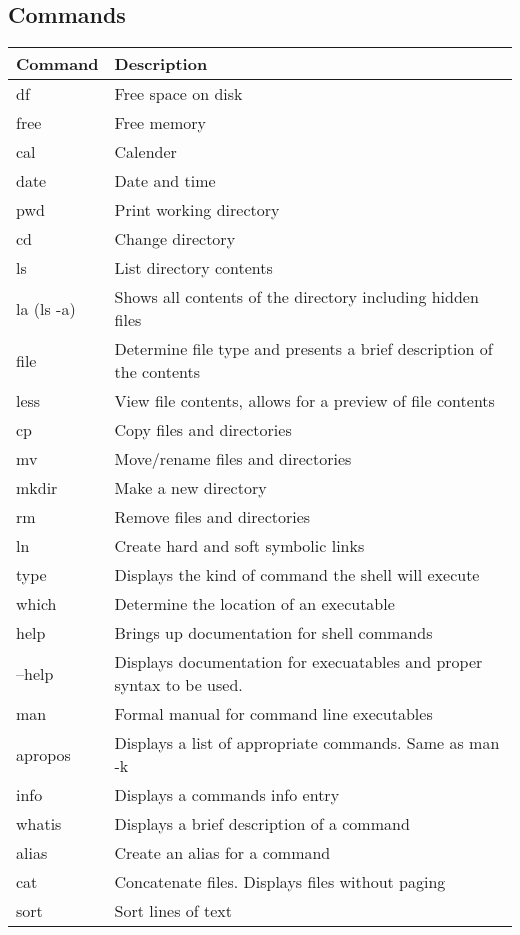 \documentclass[12pt]{article}
\begin{document}
\subsection{Commands}%
\noindent\begin{tabular}{| l | l |}
	\hline
	Command & Description\\ \hline
	df & Free space on disk\\
	free & Free memory\\
	cal & Calender\\
	date & Date and time\\
	pwd & Print working directory\\
	cd & Change directory\\
	ls & List directory contents\\
	la (ls -a)& Shows all contents of the directory including hidden files\\
	file & Determine file type and presents a brief description of the contents\\
	less & View file contents, allows for a preview of file contents\\
	cp & Copy files and directories\\
	mv & Move/rename files and directories\\
	mkdir & Make a new directory\\
	rm & Remove files and directories\\
	ln & Create hard and soft symbolic links\\
	type & Displays the kind of command the shell will execute\\
	which & Determine the location of an executable\\
	help & Brings up documentation for shell commands\\
	--help & Displays documentation for execuatables and proper syntax to be used.\\
	man & Formal manual for command line executables\\
	apropos & Displays a list of appropriate commands. Same as man -k\\
	info & Displays a commands info entry\\
	whatis & Displays a brief description of a command\\
	alias & Create an alias for a command\\
	cat & Concatenate files. Displays files without paging\\
	sort & Sort lines of text\\

\end{tabular}
\end{document}
